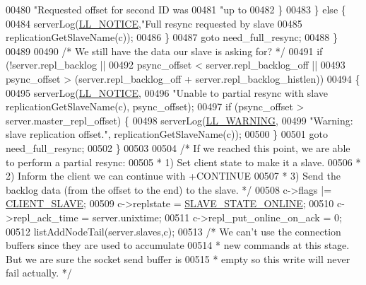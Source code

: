 \begin{DoxyCode}
{{{{{{{{{{{{{{{{{{{{{{00480                     \textcolor{stringliteral}{"Requested offset for second ID was %
00481                     \textcolor{stringliteral}{"up to %
00482             \}
00483         \} \textcolor{keywordflow}{else} \{
00484             serverLog(\hyperlink{server_8h_a8c54c191e436c7dd3012167212692401}{LL\_NOTICE},\textcolor{stringliteral}{"Full resync requested by slave %
00485                 replicationGetSlaveName(c));
00486         \}
00487         \textcolor{keywordflow}{goto} need\_full\_resync;
00488     \}
00489 
00490     \textcolor{comment}{/* We still have the data our slave is asking for? */}
00491     \textcolor{keywordflow}{if} (!server.repl\_backlog ||
00492         psync\_offset < server.repl\_backlog\_off ||
00493         psync\_offset > (server.repl\_backlog\_off + server.repl\_backlog\_histlen))
00494     \{
00495         serverLog(\hyperlink{server_8h_a8c54c191e436c7dd3012167212692401}{LL\_NOTICE},
00496             \textcolor{stringliteral}{"Unable to partial resync with slave %
      replicationGetSlaveName(c), psync\_offset);
00497         \textcolor{keywordflow}{if} (psync\_offset > server.master\_repl\_offset) \{
00498             serverLog(\hyperlink{server_8h_a31229b9334bba7d6be2a72970967a14b}{LL\_WARNING},
00499                 \textcolor{stringliteral}{"Warning: slave %
       replication offset."}, replicationGetSlaveName(c));
00500         \}
00501         \textcolor{keywordflow}{goto} need\_full\_resync;
00502     \}
00503 
00504     \textcolor{comment}{/* If we reached this point, we are able to perform a partial resync:}
00505 \textcolor{comment}{     * 1) Set client state to make it a slave.}
00506 \textcolor{comment}{     * 2) Inform the client we can continue with +CONTINUE}
00507 \textcolor{comment}{     * 3) Send the backlog data (from the offset to the end) to the slave. */}
00508     c->flags |= \hyperlink{server_8h_ae9f6995948253652bc9454d79a72f4a7}{CLIENT\_SLAVE};
00509     c->replstate = \hyperlink{server_8h_ad895fdf16e5ed5275d19ddf8578b900f}{SLAVE\_STATE\_ONLINE};
00510     c->repl\_ack\_time = server.unixtime;
00511     c->repl\_put\_online\_on\_ack = 0;
00512     listAddNodeTail(server.slaves,c);
00513     \textcolor{comment}{/* We can't use the connection buffers since they are used to accumulate}
00514 \textcolor{comment}{     * new commands at this stage. But we are sure the socket send buffer is}
00515 \textcolor{comment}{     * empty so this write will never fail actually. */}
}}}}}}}}}}}}}}}}}}}}}}}}}}
\end{DoxyCode}
